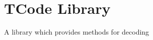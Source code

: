 \chapter{TCode Library}
\hypertarget{md_tcode__library_2_r_e_a_d_m_e}{}\label{md_tcode__library_2_r_e_a_d_m_e}
\label{md_tcode__library_2_r_e_a_d_m_e_autotoc_md0}%
%
A library which provides methods for decoding  